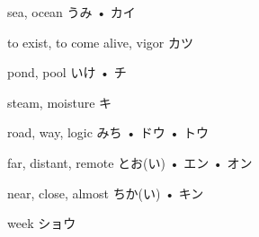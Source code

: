 



\setcounter{cardnum}{41}

		{sea, ocean}
		{うみ • カイ}
		{}{}
		{}{}
		{}{}
		{}{}
		{}{}

		{to exist, to come alive, vigor}
		{カツ}
		{}{}
		{}{}
		{}{}
		{}{}
		{}{}

		{pond, pool}
		{いけ • チ}
		{}{}
		{}{}
		{}{}
		{}{}
		{}{}

		{steam, moisture}
		{キ}
		{}{}
		{}{}
		{}{}
		{}{}
		{}{}

		{road, way, logic}
		{みち • ドウ • トウ}
		{}{}
		{}{}
		{}{}
		{}{}
		{}{}

		{far, distant, remote}
		{とお(い) • エン • オン}
		{}{}
		{}{}
		{}{}
		{}{}
		{}{}

		{near, close, almost}
		{ちか(い) • キン}
		{}{}
		{}{}
		{}{}
		{}{}
		{}{}

		{week}
		{ショウ}
		{}{}
		{}{}
		{}{}
		{}{}
		{}{}

